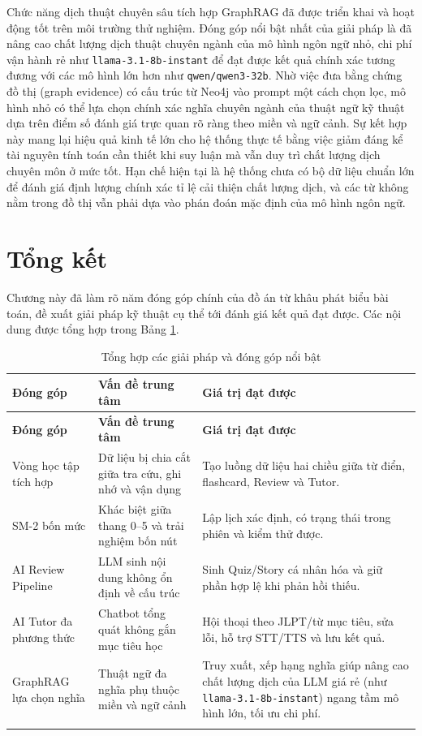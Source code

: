 \documentclass[../DoAn.tex]{subfiles}
\begin{document}
Chức năng dịch thuật chuyên sâu tích hợp GraphRAG đã được triển khai và hoạt động tốt trên môi trường thử nghiệm. Đóng góp nổi bật nhất của giải pháp là đã nâng cao chất lượng dịch thuật chuyên ngành của mô hình ngôn ngữ nhỏ, chi phí vận hành rẻ như \texttt{llama-3.1-8b-instant} để đạt được kết quả chính xác tương đương với các mô hình lớn hơn như \texttt{qwen/qwen3-32b}. Nhờ việc đưa bằng chứng đồ thị (graph evidence) có cấu trúc từ Neo4j vào prompt một cách chọn lọc, mô hình nhỏ có thể lựa chọn chính xác nghĩa chuyên ngành của thuật ngữ kỹ thuật dựa trên điểm số đánh giá trực quan rõ ràng theo miền và ngữ cảnh. Sự kết hợp này mang lại hiệu quả kinh tế lớn cho hệ thống thực tế bằng việc giảm đáng kể tài nguyên tính toán cần thiết khi suy luận mà vẫn duy trì chất lượng dịch chuyên môn ở mức tốt. Hạn chế hiện tại là hệ thống chưa có bộ dữ liệu chuẩn lớn để đánh giá định lượng chính xác tỉ lệ cải thiện chất lượng dịch, và các từ không nằm trong đồ thị vẫn phải dựa vào phán đoán mặc định của mô hình ngôn ngữ.

\section{Tổng kết}
\label{section:5.6}

Chương này đã làm rõ năm đóng góp chính của đồ án từ khâu phát biểu bài toán, đề xuất giải pháp kỹ thuật cụ thể tới đánh giá kết quả đạt được. Các nội dung được tổng hợp trong Bảng \ref{table:5.3}.

\begin{longtable}{|p{3.6cm}|p{5cm}|p{5.7cm}|}
\hline
\textbf{Đóng góp} & \textbf{Vấn đề trung tâm} & \textbf{Giá trị đạt được} \\
\hline
\endfirsthead
\hline
\textbf{Đóng góp} & \textbf{Vấn đề trung tâm} & \textbf{Giá trị đạt được} \\
\hline
\endhead
Vòng học tập tích hợp & Dữ liệu bị chia cắt giữa tra cứu, ghi nhớ và vận dụng & Tạo luồng dữ liệu hai chiều giữa từ điển, flashcard, Review và Tutor. \\
\hline
SM-2 bốn mức & Khác biệt giữa thang 0--5 và trải nghiệm bốn nút & Lập lịch xác định, có trạng thái trong phiên và kiểm thử được. \\
\hline
AI Review Pipeline & LLM sinh nội dung không ổn định về cấu trúc & Sinh Quiz/Story cá nhân hóa và giữ phần hợp lệ khi phản hồi thiếu. \\
\hline
AI Tutor đa phương thức & Chatbot tổng quát không gắn mục tiêu học & Hội thoại theo JLPT/từ mục tiêu, sửa lỗi, hỗ trợ STT/TTS và lưu kết quả. \\
\hline
GraphRAG lựa chọn nghĩa & Thuật ngữ đa nghĩa phụ thuộc miền và ngữ cảnh & Truy xuất, xếp hạng nghĩa giúp nâng cao chất lượng dịch của LLM giá rẻ (như \texttt{llama-3.1-8b-instant}) ngang tầm mô hình lớn, tối ưu chi phí. \\
\hline
\caption{Tổng hợp các giải pháp và đóng góp nổi bật}
\label{table:5.3}\\
\end{longtable}
\end{document}
